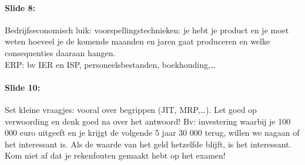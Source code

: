 \documentclass[10pt,a4paper]{report}
\begin{document}
\paragraph{Slide 8:} Bedrijfseconomisch luik: voorspellingstechnieken: je hebt je product en je moet weten hoeveel je de komende maanden en jaren gaat produceren en welke consequenties daaraan hangen.\\
ERP: bv IER en ISP, personeelsbestanden, boekhouding,… 

\paragraph{Slide 10:} Set kleine vraagjes: vooral over begrippen (JIT, MRP,…). Let goed op verwoording en denk goed na over het antwoord! Bv: investering waarbij je 100 000 euro uitgeeft en je krijgt de volgende 5 jaar 30 000 terug, willen we nagaan of het interessant is. Als de waarde van het geld hetzelfde blijft, is het interessant. Kom niet af dat je rekenfouten gemaakt hebt op het examen!
\end{document}
